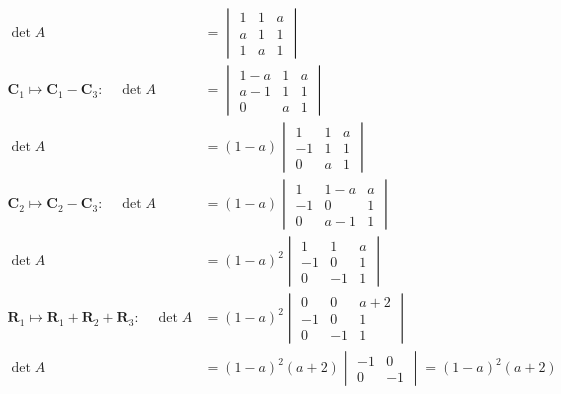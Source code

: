 \documentclass{article}
\begin{document}
	\begin{align*}
		\det A &= \begin{vmatrix} 1 & 1 & a \\ a & 1 & 1 \\ 1 & a & 1 \end{vmatrix} \\
		\bm C_1 \mapsto \bm C_1 - \bm C_3:\quad \det A &= \begin{vmatrix} 1-a & 1 & a \\ a-1 & 1 & 1 \\ 0 & a & 1 \end{vmatrix} \\
		\det A &= (1-a)\begin{vmatrix} 1 & 1 & a \\ -1 & 1 & 1 \\ 0 & a & 1 \end{vmatrix} \\
		\bm C_2 \mapsto \bm C_2 - \bm C_3:\quad \det A &= (1-a)\begin{vmatrix} 1 & 1-a & a \\ -1 & 0 & 1 \\ 0 & a-1 & 1 \end{vmatrix} \\
		\det A &= (1-a)^2\begin{vmatrix} 1 & 1 & a \\ -1 & 0 & 1 \\ 0 & -1 & 1 \end{vmatrix} \\
		\bm R_1 \mapsto \bm R_1 + \bm R_2 + \bm R_3 :\quad \det A &= (1-a)^2\begin{vmatrix} 0 & 0 & a+2 \\ -1 & 0 & 1 \\ 0 & -1 & 1 \end{vmatrix} \\
		\det A &= (1-a)^2(a+2)\begin{vmatrix}-1&0\\0&-1\end{vmatrix} = (1-a)^2(a+2)
	\end{align*}
\end{document}
